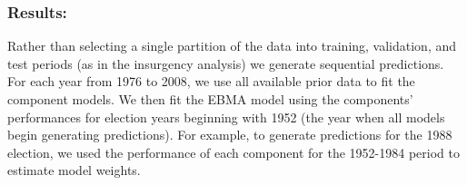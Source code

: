 \subsubsection{Results:}

Rather than selecting a single partition of the data into training,
validation, and test periods (as in the insurgency analysis) we
generate sequential predictions.  For each year from 1976 to 2008, we
use all available prior data to fit the component models.  We then fit the EBMA model using the components'
performances for election years beginning with 1952 (the year when all
models begin generating predictions).  For example, to generate
predictions for the 1988 election, we used the performance of each
component for the 1952-1984 period to estimate model weights.




